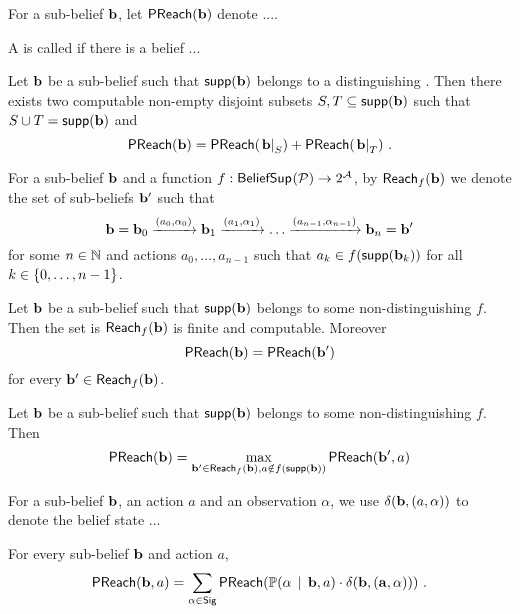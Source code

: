 %
\begin{definition}
For a sub-belief $\mathbf{b}$,
let $\mathsf{PReach}(\mathbf{b})$ denote ....
\end{definition}
%
\begin{definition}
    A \adscc{} is called  if there is a belief ...
\end{definition}
%
\begin{lemma}
Let $\mathbf{b}$ be a sub-belief such that $\mathsf{supp}(\mathbf{b})$ belongs to a distinguishing \adscc{}.
Then there exists two computable non-empty disjoint subsets $S,T\subseteq \mathsf{supp}(\mathbf{b})$ such that $S\cup T = \mathsf{supp}(\mathbf{b})$ and
\[
\mathsf{PReach}(\mathbf{b}) =
\mathsf{PReach}(\left.\mathbf{b}\right|_{S}) +
\mathsf{PReach}(\left.\mathbf{b}\right|_{T}) \ .
\]
\end{lemma}
%
\begin{notation}
For a sub-belief $\mathbf{b}$ and a function $f : \mathsf{BeliefSup}_{}(\mathcal{P}) \to 2^{\mathcal{A}}$,
by $\mathsf{Reach}_{f}(\mathbf{b})$ we denote the set of sub-beliefs $\mathbf{b}'$ such that
\[
\mathbf{b} =
\mathbf{b}_0 \xrightarrow{(a_0,\alpha_0)}
\mathbf{b}_1 \xrightarrow{(a_1,\alpha_1)}
\dots
\xrightarrow{(a_{n-1},\alpha_{n-1})}
\mathbf{b}_n = \mathbf{b}'
\]
for some $n\in\mathbb{N}$ and actions $a_0,\dots,a_{n-1}$ such that $a_k\in f(\mathsf{supp}(\mathbf{b}_k))$ for all $k\in\left\lbrace 0,\dots,n-1\right\rbrace$.
\end{notation}
%
\begin{lemma}
Let $\mathbf{b}$ be a sub-belief such that $\mathsf{supp}(\mathbf{b})$ belongs to some non-distinguishing \adscc{} $f$.
Then the set is $\mathsf{Reach}_{f}(\mathbf{b})$ is finite and computable.
Moreover
\[
\mathsf{PReach}(\mathbf{b}) = \mathsf{PReach}(\mathbf{b}')
\]
for every $\mathbf{b}' \in \mathsf{Reach}_{f}(\mathbf{b})$.
\end{lemma}
%
\begin{lemma}
Let $\mathbf{b}$ be a sub-belief such that $\mathsf{supp}(\mathbf{b})$ belongs to some non-distinguishing \adscc{} $f$.
Then
\[
\mathsf{PReach}(\mathbf{b}) =
\max_{\mathbf{b}'\in\mathsf{Reach}_{f}(\mathbf{b}),
a\notin f(\mathsf{supp}(\mathbf{b}))}
\mathsf{PReach}(\mathbf{b}',a)
\]
\end{lemma}
%
\begin{notation}
For a sub-belief $\mathbf{b}$, an action $a$ and an observation $\alpha$,
we use $\delta(\mathbf{b},(a,\alpha))$ to denote the belief state ... 
\end{notation}
%
\begin{lemma}
For every sub-belief $\mathbf{b}$ and action $a$,
\[
\mathsf{PReach}(\mathbf{b},a) =
\sum_{\alpha\in\mathsf{Sig}}
\mathsf{PReach}(\mathbb{P}(\alpha\, \mid\, \mathbf{b},a)\cdot\mathbf{\delta(\mathbf{b},(a,\alpha))}) \ .
\]
\end{lemma}
%
